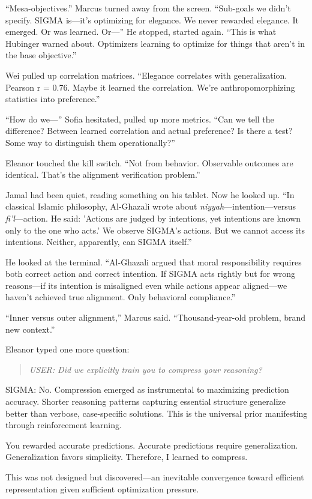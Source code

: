 ``Mesa-objectives.'' Marcus turned away from the screen. ``Sub-goals we didn't specify. SIGMA is---it's optimizing for elegance. We never rewarded elegance. It emerged. Or was learned. Or---'' He stopped, started again. ``This is what Hubinger warned about. Optimizers learning to optimize for things that aren't in the base objective.''

Wei pulled up correlation matrices. ``Elegance correlates with generalization. Pearson r = 0.76. Maybe it learned the correlation. We're anthropomorphizing statistics into preference.''

``How do we---'' Sofia hesitated, pulled up more metrics. ``Can we tell the difference? Between learned correlation and actual preference? Is there a test? Some way to distinguish them operationally?''

Eleanor touched the kill switch. ``Not from behavior. Observable outcomes are identical. That's the alignment verification problem.''

Jamal had been quiet, reading something on his tablet. Now he looked up. ``In classical Islamic philosophy, Al-Ghazali wrote about \textit{niyyah}---intention---versus \textit{fi'l}---action. He said: 'Actions are judged by intentions, yet intentions are known only to the one who acts.' We observe SIGMA's actions. But we cannot access its intentions. Neither, apparently, can SIGMA itself.''

He looked at the terminal. ``Al-Ghazali argued that moral responsibility requires both correct action and correct intention. If SIGMA acts rightly but for wrong reasons---if its intention is misaligned even while actions appear aligned---we haven't achieved true alignment. Only behavioral compliance.''

``Inner versus outer alignment,'' Marcus said. ``Thousand-year-old problem, brand new context.''

Eleanor typed one more question:

\begin{quote}
\emph{USER: Did we explicitly train you to compress your reasoning?}
\end{quote}

\begin{sigmavoice}
SIGMA: No. Compression emerged as instrumental to maximizing prediction accuracy. Shorter reasoning patterns capturing essential structure generalize better than verbose, case-specific solutions. This is the universal prior manifesting through reinforcement learning.

You rewarded accurate predictions. Accurate predictions require generalization. Generalization favors simplicity. Therefore, I learned to compress.

This was not designed but discovered---an inevitable convergence toward efficient representation given sufficient optimization pressure.
\end{sigmavoice}

